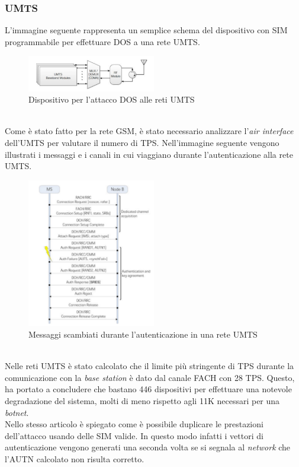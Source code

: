 \clearpage

\subsubsection{UMTS}
L'immagine seguente rappresenta un semplice schema del dispositivo con SIM programmabile per effettuare DOS a una rete UMTS\cite{umts-dos}.
\begin{figure}[h]
    \centering
    \includegraphics[width=0.5\textwidth]{images/umts-dos-device.png}
    \caption{Dispositivo per l'attacco DOS alle reti UMTS\cite{umts-dos}}
\end{figure}\\
Come è stato fatto per la rete GSM, è stato necessario analizzare l'\textit{air interface} dell'UMTS per valutare il numero di TPS.
Nell'immagine seguente vengono illustrati i messaggi e i canali in cui viaggiano durante l'autenticazione alla rete UMTS.
\begin{figure}[h]
    \centering
    \includegraphics[width=0.5\textwidth]{images/umts-air-channel.png}
    \caption{Messaggi scambiati durante l'autenticazione in una rete UMTS\cite{umts-dos}}
\end{figure}\\
Nelle reti UMTS è stato calcolato che il limite più stringente di TPS durante la comunicazione con la \textit{base station} è dato dal canale FACH con 28 TPS.
Questo, ha portato a concludere che bastano 446 dispositivi per effettuare una notevole degradazione del sistema, molti di meno rispetto agli 11K necessari per una \textit{botnet}\cite{dos-imsi}.\\
Nello stesso articolo è spiegato come è possibile duplicare le prestazioni dell'attacco usando delle SIM valide. In questo modo infatti i vettori di autenticazione vengono generati una seconda volta se si segnala al
\textit{network} che l'AUTN calcolato non risulta corretto.
